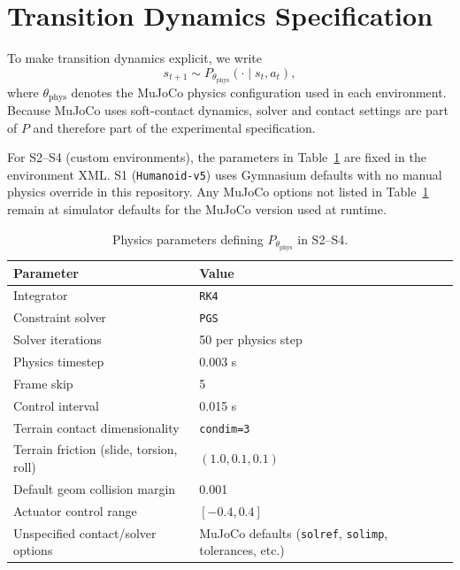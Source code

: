 \documentclass[conference]{IEEEtran}
\begin{document}
\section{Transition Dynamics Specification}
\label{app:transition}

To make transition dynamics explicit, we write
\begin{equation}
    s_{t+1} \sim P_{\theta_{\mathrm{phys}}}(\cdot \mid s_t, a_t),
\end{equation}
where $\theta_{\mathrm{phys}}$ denotes the MuJoCo physics configuration used in each environment.
Because MuJoCo uses soft-contact dynamics, solver and contact settings are part of $P$ and therefore part of the experimental specification.

For S2--S4 (custom environments), the parameters in Table~\ref{tab:transition_params} are fixed in the environment XML.
S1 (\texttt{Humanoid-v5}) uses Gymnasium defaults with no manual physics override in this repository.
Any MuJoCo options not listed in Table~\ref{tab:transition_params} remain at simulator defaults for the MuJoCo version used at runtime.

\begin{table}[h!]
\caption{Physics parameters defining $P_{\theta_{\mathrm{phys}}}$ in S2--S4.}
\label{tab:transition_params}
\centering
\footnotesize
\begin{tabular}{@{}ll@{}}
\toprule
\textbf{Parameter} & \textbf{Value} \\
\midrule
Integrator & \texttt{RK4} \\
Constraint solver & \texttt{PGS} \\
Solver iterations & 50 per physics step \\
Physics timestep & 0.003 s \\
Frame skip & 5 \\
Control interval & 0.015 s \\
Terrain contact dimensionality & \texttt{condim=3} \\
Terrain friction (slide, torsion, roll) & $(1.0, 0.1, 0.1)$ \\
Default geom collision margin & 0.001 \\
Actuator control range & $[-0.4, 0.4]$ \\
Unspecified contact/solver options & MuJoCo defaults (\texttt{solref}, \texttt{solimp}, tolerances, etc.) \\
\bottomrule
\end{tabular}
\end{table}
\end{document}
